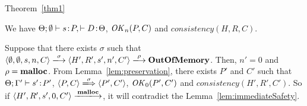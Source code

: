 \begin{pfof}{Theorem~\ref{thm1}}

We have \(\Theta;\emptyset \vdash s\!:\! P, \vdash D\!:\! \Theta\),
\(\mathit{OK}_n(P, C)\) and  \(consistency(H, R, C)\).

Suppose that there exists \(\sigma\) such that \(\langle \emptyset,
\emptyset, s, n, C\rangle \xlongrightarrow{\sigma} \langle H', R', s',
n', C'\rangle \xlongrightarrow{\rho} \OVERFLOW\).  Then, \(n' = 0\)
and \(\rho = \mathbf{malloc} \).  From Lemma~\ref{lem:preservation}, there
exists \(P'\) and \(C'\) such that \(\Theta; \Gamma' \vdash s' \!:\!
P'\), \( \langle P, C \rangle \xLongrightarrow{\sigma} \langle P', C'
\rangle \), \(\mathit{OK}_0(P', C')\) and \(consistency(H', R', C')\). So if
\(\langle H', R', s', 0, C'\rangle \xlongrightarrow{\Malloc}\), it
will contradict the Lemma~\ref{lem:immediateSafety}.

\end{pfof}
